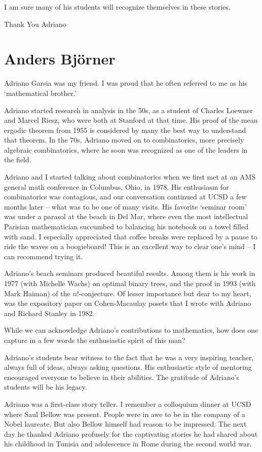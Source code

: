 \documentclass{notices}
\begin{document}
I am sure many of his students will recognize themselves in these stories.

Thank You Adriano

\section*{Anders Bj\"orner}

Adriano Garsia was my friend. I was proud that he often referred to me as his `mathematical brother.' 
 
Adriano started research in analysis in the 50s, as a student of Charles Loewner and Marcel Riesz, who were both at Stanford at that time. His proof of the mean ergodic theorem from 1955 is considered by many the best way to understand that theorem. In the 70s, Adriano moved on to combinatorics, more precisely algebraic combinatorics, where he soon was recognized as one of the leaders in the field.
 
Adriano and I started talking about combinatorics when we first met at an AMS general math conference in Columbus, Ohio, in 1978. His enthusiasm for combinatorics was contagious, and our conversation continued at UCSD a few months later – what was to be one of many visits. His favorite `seminar room' was under a parasol at the beach in Del Mar, where even the most intellectual Parisian mathematician succumbed to balancing his notebook on a towel filled with sand. I especially appreciated that coffee breaks were replaced by a pause to ride the waves on a boogieboard! This is an excellent way to clear one's mind – I can recommend trying it.
 
Adriano's beach seminars produced beautiful results. Among them is his work in 1977 (with Michelle Wachs) on optimal binary trees, and the proof in 1993 (with Mark Haiman) of the $n!$-conjecture. Of lesser importance but dear to my heart, was the expository paper on Cohen-Macaulay posets that I wrote with Adriano and Richard Stanley in 1982. 
 
While we can acknowledge Adriano's contributions to mathematics, how does one capture in a few words the enthusiastic spirit of this man?
 
Adriano's students bear witness to the fact that he was a very inspiring teacher, always full of ideas, always asking questions.  His enthusiastic style of mentoring encouraged everyone to believe in their abilities. The gratitude of Adriano's students will be his legacy.
 
Adriano was a first-class story teller. I remember a colloquium dinner at UCSD where Saul Bellow was present. People were in awe to be in the company of a Nobel laureate. But also Bellow himself had reason to be impressed.  The next day he thanked Adriano profusely for the captivating stories he had shared about his childhood in Tunisia and adolescence in Rome during the second world war.
 
\end{document}
